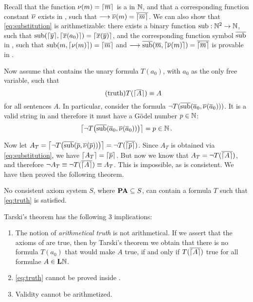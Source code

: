 \documentclass[11pt,a4paper]{article}
\begin{document}
Recall that the function \(\nu(m) = \G{\num m}\) is a \PRF{} in \(\Nset\),
and that a corresponding function constant \(\num\nu\) exists in \PA{},
such that \(\seq\num\nu(m) = \num{\G{\num m}}\). We can also show that
\eqref{eq:substitution} is arithmetizable: there exists a binary function
\(\sub:\Nset^2\to\Nset\), such that
\(\sub(\G{\num y},\G{\num x(a_0)})=\G{\num x(\num y)}\),
and the corresponding function symbol \(\num\sub\) in \PA,
such that \(\sub(m,\G{\nu(m)})=\G{\num m}\) and
\(\seq\num\sub(\num m,\G{\num\nu(m)})=\num{\G{\num m}}\)
is provable in \PA{}.

Now assume that \PA{} contains the unary formula \(T(a_0)\),
with \(a_0\) as the only free variable, such that
\begin{equation}\tag{truth}\label{eq:truth}
   T(\G{\num A})\equiv A
\end{equation}
for all sentences \(A\).
In particular, consider the formula  \(\lnot T(\num\sub(\num a_0, \num\nu(\num a_0)))\).
It is a valid string in \PA{} and therefore it must have a Gödel number \(p\in\Nset\):
\begin{equation*}
    \G*{\lnot T\arcs*{\num\sub\arcs*{\num a_0, \num\nu(\num a_0)}}} = p\in\Nset\,.
\end{equation*}

Now let \(A_T =\G*{\lnot T\arcs*{\num\sub\arcs*{\num p, \num\nu(\num p)}}} = \lnot T(\num{\G*{\num p}})\).
Since \(A_T\) is obtained via \eqref{eq:substitution}, we have
\(\G{A_T} = \G*{\num p}\). But now we know that \(A_T = \lnot T\arcs{\num{\G{A}}}\),
and therefore \(\lnot A_T\equiv\lnot T\arcs{\num{\G{A}}}\equiv A_T\).
This is impossible, as \PA{} is consistent.
We have then proved the following theorem.

\begin{theorem}[Tarski]\label{the:Tarski}
    No consistent axiom system \(S\), where \(\PA\subseteq S\),
    can contain a formula \(T\) such that \eqref{eq:truth} is satisfied.
\end{theorem}

Tarski's theorem has the following \(3\) implications:
\begin{enumerate}
    \item
        The notion of \emph{arithmetical truth} is not arithmetical.
        If we assert that the axioms of \PA{} are true,
        then by Tarski's theorem we obtain that there is no formula
        \(T(a_0)\) that would make \(A\) true, if and only if \(T(\num{\G A})\)
        true for all formulae \(A\in\LN\).
    \item
        \eqref{eq:truth} cannot be proved inside \PA{}.
    \item
        Validity cannot be arithmetized.
\end{enumerate}
\end{document}
